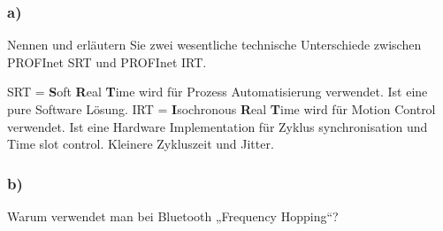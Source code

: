 \subsubsection{a)}
Nennen und erläutern Sie zwei wesentliche technische Unterschiede zwischen PROFInet SRT und
PROFInet IRT.

SRT = \textbf{S}oft \textbf{R}eal \textbf{T}ime wird für Prozess Automatisierung verwendet. Ist eine pure Software Lösung.
IRT = \textbf{I}sochronous \textbf{R}eal \textbf{T}ime wird für Motion Control verwendet. Ist eine Hardware Implementation  für Zyklus
synchronisation und Time slot control. Kleinere Zykluszeit und Jitter.

\subsubsection{b)}
Warum verwendet man bei Bluetooth „Frequency Hopping“?

